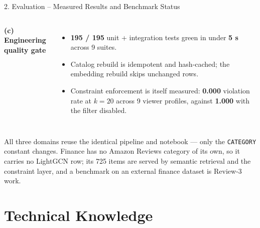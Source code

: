 \documentclass[aspectratio=169, 11pt]{beamer}
\begin{document}
\begin{frame}{2. Evaluation -- Measured Results and Benchmark Status}
\begin{columns}[T]
{\scriptsize \textbf{(c) Engineering quality gate}}
\begin{itemize}\tiny
  \item \textbf{195 / 195} unit + integration tests green in under \textbf{5 s} across 9 suites.
  \item Catalog rebuild is idempotent and hash-cached; the embedding rebuild skips unchanged rows.
  \item Constraint enforcement is itself measured: \textbf{0.000} violation rate at $k{=}20$ across
        9 viewer profiles, against \textbf{1.000} with the filter disabled.
\end{itemize}
\end{columns}
\vspace{-1mm}
{\tiny \textcolor{amritaSlate}{All three domains reuse the identical pipeline and notebook --- only the
\texttt{CATEGORY} constant changes. Finance has no Amazon Reviews category of its own, so it carries
no LightGCN row; its 725 items are served by semantic retrieval and the constraint layer, and a
benchmark on an external finance dataset is Review-3 work.}}
\end{frame}

\section{Technical Knowledge}
\end{document}
